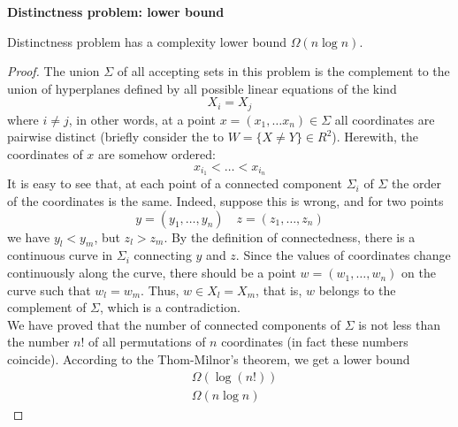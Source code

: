 \textbf{Distinctness problem: lower bound}
\begin{theorem}
    Distinctness problem has a complexity lower bound $\Omega(n \log n)$.
\end{theorem}
\begin{proof}
    The union $\Sigma$ of all accepting sets in this problem
    is the complement to the union of hyperplanes defined by
    all possible linear equations of the kind
    $$X_i = X_j$$
    where $i \neq j$,
    in other words,
    at a point $x = (x_1, \dots x_n) \in \Sigma$ all coordinates are pairwise distinct
    (briefly consider the to $W = \{X \neq Y \} \in R^2$).
    Herewith, the coordinates of $x$ are somehow ordered:
    $$x_{i_1} < \dots < x_{i_n}$$
    It is easy to see that,
    at each point of a connected component $\Sigma_i$ of $\Sigma$
    the order of the coordinates is the same.
    Indeed, suppose this is wrong, and for two points
    $$y = (y_1, \dots , y_n)\quad z = (z_1, \dots , z_n)$$
    we have $y_l < y_m$,
    but $z_l > z_m$.
    By the definition of connectedness,
    there is a continuous curve in $\Sigma_i$ connecting $y$ and $z$.
    Since the values of coordinates change continuously along the curve,
    there should be a point $w = (w_1, \dots , w_n)$ on the curve such that $w_l = w_m$.
    Thus, $w \in {X_l = X_m}$,
    that is, $w$ belongs to the complement of $\Sigma$, which is a contradiction.\\

    We have proved that the number of connected components of $\Sigma$
    is not less than the number $n!$ of all permutations of $n$ coordinates (in fact these numbers coincide).
    According to the Thom-Milnor’s theorem, we get a lower bound
    \begin{align*}
        &\Omega(\log(n!)) \\
        &\Omega(n \log n)
    \end{align*}
\end{proof}
